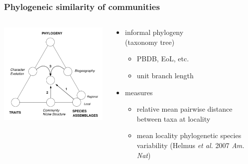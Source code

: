 \documentclass{beamer}
\begin{document}
\begin{frame}
  \frametitle{Phylogeneic similarity of communities}

  \begin{columns}
    \begin{column}{0.5\textwidth}
      \includegraphics[height = 0.8\textheight, width = \textwidth,  keepaspectratio = true]{figure/webb}

      \tiny{}
    \end{column}
    \begin{column}{0.5\textwidth}
      \begin{itemize}
        \item informal phylogeny \\(taxonomy tree)
          \begin{itemize}
            \item PBDB, EoL, etc.
            \item unit branch length
          \end{itemize}
        \item measures
          \begin{itemize}
            \item relative mean pairwise distance between taxa at locality
            \item mean locality phylogenetic species variability (Helmus \textit{et al.} 2007 \textit{Am. Nat})
          \end{itemize}
      \end{itemize}
    \end{column}
  \end{columns}
\end{frame}
\end{document}
